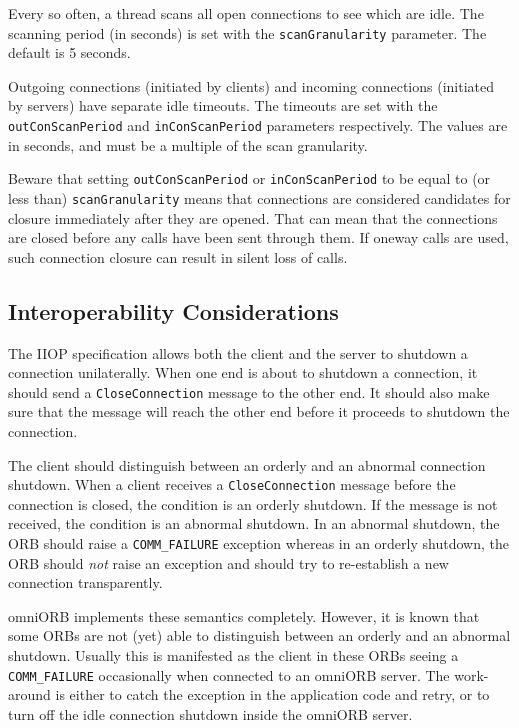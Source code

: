 \documentclass[11pt,twoside,a4paper]{book}
\newcommand{\code}[1]{\texttt{#1}}
\newcommand{\dsc}{\discretionary{}{}{}}
\begin{document}
Every so often, a thread scans all open connections to see which are
idle. The scanning period (in seconds) is set with the
\code{scanGranularity} parameter. The default is 5 seconds.

Outgoing connections (initiated by clients) and incoming connections
(initiated by servers) have separate idle timeouts.  The timeouts are
set with the \code{outConScan\dsc{}Period} and \code{inConScanPeriod}
parameters respectively. The values are in seconds, and must be a
multiple of the scan granularity.

Beware that setting \code{outConScanPeriod} or \code{inConScanPeriod}
to be equal to (or less than) \code{scanGranularity} means that
connections are considered candidates for closure immediately after
they are opened. That can mean that the connections are closed before
any calls have been sent through them. If oneway calls are used, such
connection closure can result in silent loss of calls.


\subsection{Interoperability Considerations}

The IIOP specification allows both the client and the server to
shutdown a connection unilaterally. When one end is about to shutdown
a connection, it should send a \code{CloseConnection} message to the
other end. It should also make sure that the message will reach the
other end before it proceeds to shutdown the connection.

The client should distinguish between an orderly and an abnormal
connection shutdown. When a client receives a \code{CloseConnection}
message before the connection is closed, the condition is an orderly
shutdown.  If the message is not received, the condition is an
abnormal shutdown.  In an abnormal shutdown, the ORB should raise a
\code{COMM\_FAILURE} exception whereas in an orderly shutdown, the ORB
should \emph{not} raise an exception and should try to re-establish a
new connection transparently.

omniORB implements these semantics completely. However, it is known
that some ORBs are not (yet) able to distinguish between an orderly
and an abnormal shutdown. Usually this is manifested as the client in
these ORBs seeing a \code{COMM\_FAILURE} occasionally when connected
to an omniORB server. The work-around is either to catch the exception
in the application code and retry, or to turn off the idle connection
shutdown inside the omniORB server.
\end{document}
